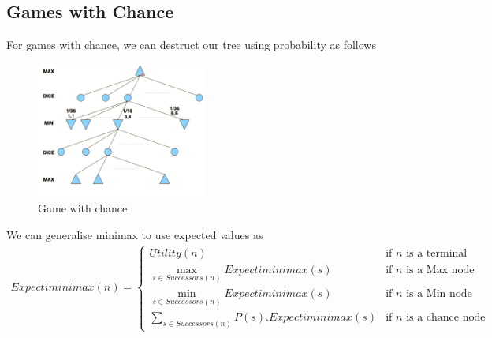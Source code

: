 \documentclass[a4paper]{article}
\theoremstyle{plain}
\theoremstyle{definition}
\theoremstyle{remark}
\begin{document}
\subsection{Games with Chance}
For games with chance, we can destruct our tree using probability as follows
\begin{figure}[H]
	\centering
	\includegraphics[width=0.5\textwidth]{seven.png}
	\caption{Game with chance}
	\label{fig:seven-png}
\end{figure}
We can generalise minimax to use expected values as
\begin{align*}
	Expectiminimax(n)=
	\begin{cases}
		Utility(n) & \text{if $n$ is a terminal}\\
		\max_{s\in Successors(n)} Expectiminimax(s) & \text{if $n$ is a Max node}\\
		\min_{s\in Successors(n)} Expectiminimax(s) & \text{if $n$ is a Min node}\\
		\sum_{s \in Successors(n)}P(s).Expectiminimax(s) &\text{if $n$ is a chance node}
	\end{cases}
\end{align*}
\end{document}
